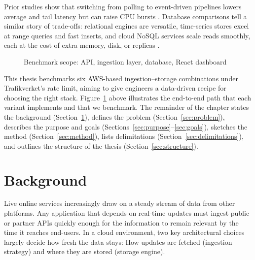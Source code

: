 \documentclass[nomenclature, english, biblatex]{kththesis}
\numberwithin{listing}{chapter}
\begin{document}
\noindent
Prior studies show that switching from polling to event-driven pipelines lowers average and tail latency but can raise CPU bursts \cite{Trindade2021EDAImpact}. 
Database comparisons tell a similar story of trade-offs: relational engines are versatile, time-series stores excel at range queries and fast inserts, and cloud NoSQL services scale reads smoothly, each at the cost of extra memory, disk, or replicas \cite{Heldt2021SciTS,Grzesik2020EdgeIoTBenchmark,Vergara2021PerformanceTSDB}.

\begin{figure}[htbp]
  \centering
  \caption{Benchmark scope: API, ingestion layer, database, React dashboard}
  \label{fig:pipeline}
\end{figure}

\noindent
This thesis benchmarks six AWS-based ingestion–storage combinations under Trafikverket's rate limit, aiming to give engineers a data-driven recipe for choosing the right stack. Figure~\ref{fig:pipeline} above illustrates the end-to-end path that each variant implements and that we benchmark.
The remainder of the chapter states the background (Section~\ref{sec:background}), defines the problem (Section~\ref{sec:problem}), describes the purpose and goals (Sections~\ref{sec:purpose}–\ref{sec:goals}), sketches the method (Section~\ref{sec:method}), lists delimitations (Section~\ref{sec:delimitations}), and outlines the structure of the thesis (Section~\ref{sec:structure}).




\section{Background}
\label{sec:background}
Live online services increasingly draw on a steady stream of data from other platforms. Any application that depends on real-time updates must ingest public or partner \glspl{API} quickly enough for the information to remain relevant by the time it reaches end-users. In a cloud environment, two key architectural choices largely decide how fresh the data stays: How updates are fetched (ingestion strategy) and where they are stored (storage engine).
\end{document}
